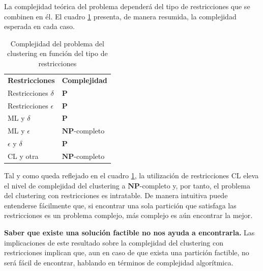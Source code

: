 La complejidad teórica del problema dependerá del tipo de restricciones que se combinen en él. El cuadro \ref{tab:tabla1} presenta, de manera resumida, la complejidad esperada en cada caso. 

\begin{table}[h]
	\centering
	\setlength{\arrayrulewidth}{1mm}
	\setlength{\tabcolsep}{10pt}
	\renewcommand{\arraystretch}{1}
	
	\begin{tabular}{ >{\centering\arraybackslash}m{4cm}  >{\centering\arraybackslash}m{4cm} }
		\hline
		\rowcolor{black}
		\multicolumn{2}{c}{\bf \color{white}{Complejidad del clustering con restricciones}}\\
		\hline
		\rowcolor{gray!50}
		\textbf{Restricciones} & \textbf{Complejidad} \\
		Restricciones $\delta$ & $\mathbf{P}$ \\
		Restricciones $\epsilon$ & $\mathbf{P}$ \\
		\acs{ML} y $\delta$ & $\mathbf{P}$ \\
		\acs{ML} y $\epsilon$ & $\mathbf{NP}$-completo \\
		$\epsilon$ y $\delta$ & $\mathbf{P}$ \\
		\acs{CL} y otra & $\mathbf{NP}$-completo \\
		\hline
		
	\end{tabular}
	\caption[Complejidad del problema del clustering en función del tipo de restricciones]{Complejidad del problema del clustering en función del tipo de restricciones \cite{Survey:2007}}
	\label{tab:tabla1}
\end{table}

Tal y como queda reflejado en el cuadro \ref{tab:tabla1}, la utilización de restricciones \acf{CL} eleva el nivel de complejidad del clustering a $\mathbf{NP}$-completo y, por tanto, el problema del clustering con restricciones es intratable. De manera intuitiva puede entenderse fácilmente que, si encontrar una sola partición que satisfaga las restricciones es un problema complejo, más complejo es aún encontrar la mejor. 

\begin{observacion}
	
	\textbf{Saber que existe una solución factible no nos ayuda a encontrarla.} Las implicaciones de este resultado sobre la complejidad del clustering con restricciones implican que, aun en caso de que exista una partición factible, no será fácil de encontrar, hablando en términos de complejidad algorítmica. \cite{Survey:2007}
	\label{ob:observacion34}
	
\end{observacion} 

